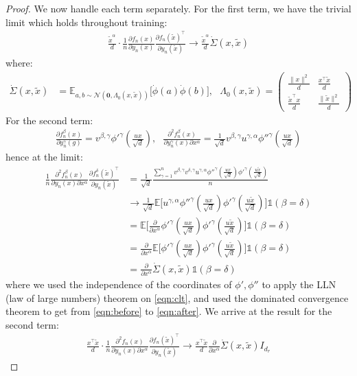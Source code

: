 \documentclass{article}
\theoremstyle{definition}
\theoremstyle{remark}
\renewcommand{\[}{\begin{eqnarray}}
\renewcommand{\]}{\end{eqnarray}}
\renewcommand{\[}{\begin{eqnarray}}
\renewcommand{\]}{\end{eqnarray}}
\newcommand{\E}{\mathbb{E}}
\begin{document}
\begin{proof}
We now handle each term separately. For the first term, we have the trivial limit which holds throughout training:
\begin{align}
    \frac{\tilde{x}^\alpha}{d}\cdot \frac{1}{n}\frac{\partial f_n(x)}{\partial y_n(x)}\frac{\partial f_n(\tilde{x})^\top}{\partial y_n(\tilde{x})} \to \frac{\tilde{x}^\alpha}{d}\dot{\Sigma}(x,\tilde{x})
\end{align}
where:
\begin{align}
    \dot{\Sigma}(x,\tilde{x}) &= \E_{a,b \sim \mathcal{N}(\bm{0},\Lambda_0(x,\tilde{x}))}\big[\dot{\phi}(a)\dot{\phi}(b)\big],~~~
    \Lambda_0(x,\tilde{x}) = \begin{pmatrix} \frac{\|x\|^2}{d} & \frac{x^\top \tilde{x}}{d}\\ \frac{\tilde{x}^\top x}{d} & \frac{\|\tilde{x}\|^2}{d} \end{pmatrix}
\end{align}
For the second term:
\begin{align}
    \frac{\partial f_n^\beta(x)}{\partial y_n^\gamma(g)} = v^{\beta,\gamma} \phi'^\gamma(\frac{ux}{\sqrt{d}}),~~~\frac{\partial^2 f_n^\beta(x)}{\partial y_n^\gamma(x) \partial x^\alpha} = \frac{1}{\sqrt{d}}v^{\beta,\gamma}u^{\gamma,\alpha} \phi''^\gamma(\frac{ux}{\sqrt{d}})
\end{align}
hence at the limit:
\begin{align}
    \frac{1}{n}\frac{\partial^2 f_n^\beta(x)}{\partial y_n(x) \partial x^\alpha}\frac{\partial f_n^\delta(\tilde{x})^\top}{\partial y_n(\tilde{x})} &= \frac{1}{\sqrt{d}}\frac{\sum_{\gamma=1}^n v^{\beta,\gamma}v^{\delta,\gamma}u^{\gamma,\alpha} \phi''^\gamma(\frac{ux}{\sqrt{d}})\phi'^\gamma(\frac{u\tilde{x}}{\sqrt{d}})}{n} \label{eqn:clt}\\
    &\to \frac{1}{\sqrt{d}}\E\Big[u^{\gamma,\alpha}\phi''^\gamma(\frac{ux}{\sqrt{d}})\phi'^\gamma(\frac{u\tilde{x}}{\sqrt{d}}) \Big]\mathbb{1}(\beta = \delta)\label{eqn:before}\\
    &= \E\Big[\frac{\partial}{\partial x^\alpha} \phi'^\gamma(\frac{ux}{\sqrt{d}})\phi'^\gamma(\frac{u\tilde{x}}{\sqrt{d}}) \Big]\mathbb{1}(\beta = \delta)\label{eqn:after}\\
    &= \frac{\partial}{\partial x^\alpha}\E\Big[ \phi'^\gamma(\frac{ux}{\sqrt{d}})\phi'^\gamma(\frac{u\tilde{x}}{\sqrt{d}}) \Big]\mathbb{1}(\beta = \delta)\\
    &= \frac{\partial}{\partial x^\alpha}\dot{\Sigma}(x,\tilde{x})\mathbb{1}(\beta = \delta)
\end{align}
where we used the independence of the coordinates of $\phi',\phi''$ to apply the LLN (law of large numbers) theorem on \cref{eqn:clt}, and used the dominated convergence theorem to get from \cref{eqn:before} to \cref{eqn:after}. We arrive at the result for the second term:
\begin{align}
    \frac{x^\top \tilde{x}}{d}\cdot \frac{1}{n}\frac{\partial^2 f_n(x)}{\partial y_n(x) \partial x^\alpha}\frac{\partial f_n(\tilde{x})^\top}{\partial y_n(\tilde{x})} \to \frac{x^\top \tilde{x}}{d}\frac{\partial}{\partial x^\alpha}\dot{\Sigma}(x,\tilde{x})I_{d_r}
\end{align}


\end{proof}
\end{document}
